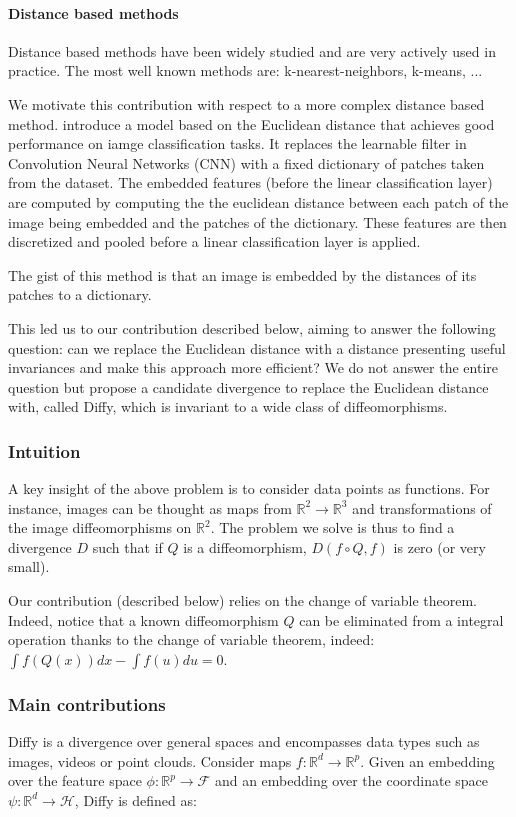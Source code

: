 \paragraph{Distance based methods}
Distance based methods have been widely studied and are very actively used in practice. The most well known methods are: k-nearest-neighbors, k-means, ...

We motivate this contribution with respect to a more complex distance based method. \cite{thiry} introduce a model based on the Euclidean distance that achieves good performance on iamge classification tasks. It replaces the learnable filter in Convolution Neural Networks (CNN) with a fixed dictionary of patches taken from the dataset. The embedded features (before the linear classification layer) are computed by computing the the euclidean distance between each patch of the image being embedded and the patches of the dictionary. These features are then discretized and pooled before a linear classification layer is applied.

The gist of this method is that an image is embedded by the distances of its patches to a dictionary.

This led us to our contribution described below, aiming to answer the following question: can we replace the Euclidean distance with a distance presenting useful invariances and make this approach more efficient? We do not answer the entire question but propose a candidate divergence to replace the Euclidean distance with, called Diffy, which is invariant to a wide class of diffeomorphisms.

\subsubsection{Intuition}
A key insight of the above problem is to consider data points as functions. For instance, images can be thought as maps from $\mathbb R^2 \to \mathbb R^3$ and transformations of the image diffeomorphisms on $\mathbb R^2$. The problem we solve is thus to find a divergence $D$ such that if $Q$ is a diffeomorphism, $D(f\circ Q, f)$ is zero (or very small).

Our contribution (described below) relies on the change of variable theorem. Indeed, notice that a known diffeomorphism $Q$ can be eliminated from a integral operation thanks to the change of variable theorem, indeed: $\int f(Q(x))dx - \int f(u)du = 0$.

\subsubsection{Main contributions}
Diffy is a divergence over general spaces and encompasses data types such as images, videos or point clouds. Consider maps $f:\mathbb R^d \to \mathbb R^p$. Given an embedding over the feature space $\phi: \mathbb R^p \to\mathcal F$ and an embedding over the coordinate space $\psi: \mathbb R^d \to \mathcal H$, Diffy is defined as:

